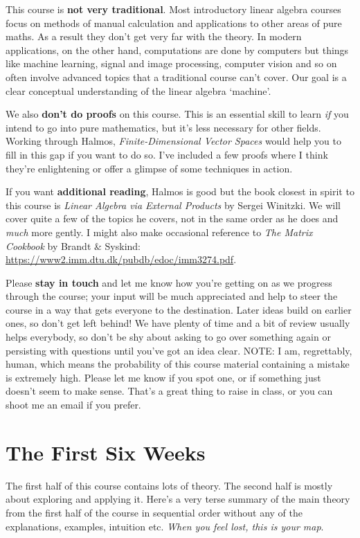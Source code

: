\documentclass[oneside,english]{amsbook}
\numberwithin{section}{chapter}
\theoremstyle{plain}
\theoremstyle{definition}
\begin{document}
This course is \textbf{not very traditional}. Most introductory linear
algebra courses focus on methods of manual calculation and applications
to other areas of pure maths. As a result they don't get very far with
the theory. In modern applications, on the other hand, computations are
done by computers but things like machine learning, signal and image
processing, computer vision and so on often involve advanced topics that
a traditional course can't cover. Our goal is a clear conceptual
understanding of the linear algebra `machine'.

We also \textbf{don't do proofs} on this course. This is an essential
skill to learn \emph{if} you intend to go into pure mathematics, but
it's less necessary for other fields. Working through Halmos,
\emph{Finite-Dimensional Vector Spaces} would help you to fill in this
gap if you want to do so. I've included a few proofs where I think
they're enlightening or offer a glimpse of some techniques in action.

If you want \textbf{additional reading}, Halmos is good but the book
closest in spirit to this course is \emph{Linear Algebra via External
	Products} by Sergei Winitzki. We will cover quite a few of the topics he
covers, not in the same order as he does and \emph{much} more gently. I
might also make occasional reference to \emph{The Matrix Cookbook} by
Brandt \& Syskind: \url{https://www2.imm.dtu.dk/pubdb/edoc/imm3274.pdf}.

Please \textbf{stay in touch} and let me know how you're getting on as
we progress through the course; your input will be much appreciated and
help to steer the course in a way that gets everyone to the destination.
Later ideas build on earlier ones, so don't get left behind! We have
plenty of time and a bit of review usually helps everybody, so don't be
shy about asking to go over something again or persisting with questions
until you've got an idea clear. NOTE: I am, regrettably, human, which
means the probability of this course material containing a mistake is
extremely high. Please let me know if you spot one, or if something just
doesn't seem to make sense. That's a great thing to raise in class, or
you can shoot me an email if you prefer.

\part{The First Six Weeks}

The first half of this course contains lots of theory. The second half
is mostly about exploring and applying it. Here's a very terse summary
of the main theory from the first half of the course in sequential order
without any of the explanations, examples, intuition etc. \emph{When you
	feel lost, this is your map}.
\end{document}
